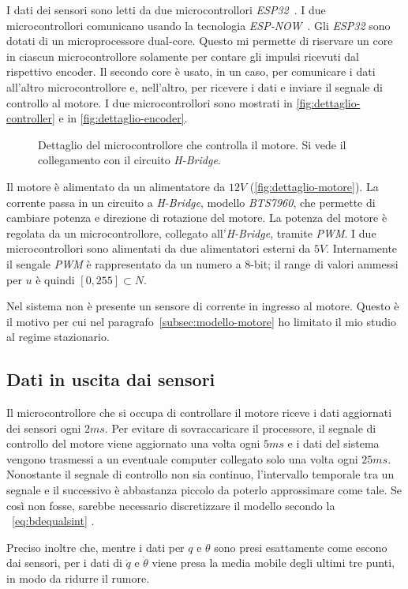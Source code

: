 I dati dei sensori sono letti da due microcontrollori \emph{ESP32}~\cite{esp32}.
I due microcontrollori comunicano usando la tecnologia \emph{ESP-NOW}~\cite{espnow}.
Gli \emph{ESP32} sono dotati di un microprocessore dual-core. Questo mi
permette di riservare un core in ciascun microcontrollore solamente per contare
gli impulsi ricevuti dal rispettivo encoder. Il secondo core è usato, in un caso,
per comunicare i dati all'altro microcontrollore e, nell'altro, per ricevere i dati
e inviare il segnale di controllo al motore. I due microcontrollori sono mostrati
in \autoref{fig:dettaglio-controller} e in \autoref{fig:dettaglio-encoder}.

\begin{figure}[h]
    \centering
    \caption[Dettaglio controller]{Dettaglio
    del microcontrollore che controlla il motore.
    Si vede il collegamento con il circuito
    \emph{H-Bridge}.}
    \label{fig:dettaglio-controller}
\end{figure}

Il motore è alimentato da un alimentatore da $12V$ (\autoref{fig:dettaglio-motore}).
La corrente passa in un circuito a \emph{H-Bridge}, modello \emph{BTS7960},
che permette di cambiare potenza e direzione di rotazione del motore.
La potenza del motore è regolata da un microcontrollore, collegato all'\emph{H-Bridge}, tramite \emph{PWM}\footnotemark. I due microcontrollori sono alimentati da due alimentatori esterni da $5V$. Internamente il sengale \emph{PWM} è rappresentato da un
numero a $8$-bit; il range di valori ammessi per $u$ è quindi $[0, 255] \subset N$.



Nel sistema non è presente un sensore di corrente in ingresso al motore.
Questo è il motivo per cui nel paragrafo~\ref{subsec:modello-motore} ho limitato
il mio studio al regime stazionario.

\subsection{Dati in uscita dai sensori}
Il microcontrollore che si occupa di controllare il motore riceve i dati
aggiornati dei sensori ogni $2ms$.
Per evitare di sovraccaricare il processore, il segnale di controllo
del motore viene aggiornato una volta ogni $5ms$ e i dati del sistema vengono
trasmessi a un eventuale computer collegato solo una volta ogni $25ms$.
Nonostante il segnale di controllo non sia continuo, l'intervallo temporale
tra un segnale e il successivo è abbastanza piccolo da poterlo approssimare come
tale.
Se così non fosse, sarebbe necessario discretizzare
il modello secondo la ~\eqref{eq:bdequalsint} .

Preciso inoltre che, mentre i dati per $q$ e $\theta$ sono presi esattamente
come escono dai sensori, per i dati di $\dot q$ e $\dot \theta$ viene presa
la media mobile degli ultimi tre punti, in modo da ridurre il rumore.